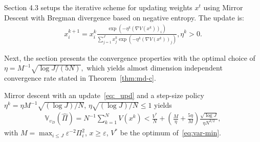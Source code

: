 Section 4.3 setups the iterative scheme for updating weights $x^t$ using Mirror Descent with Bregman divergence based on negative entropy. The update is:
\begin{align}
\label{eq:_upd}x^{k+1}_i = x^k_i \frac{\exp(-\eta^k(\nabla V(x^k))_i)}{\sum_{j=1}^J x^k_j \exp(-\eta^k(\nabla V(x^k))_j)}, \eta^k > 0.
\end{align}

Next, the section presents the convergence properties
with the optimal choice of 
$\eta = M^{-1}\sqrt{\log J/(5N)},$ which yields almost dimension independent convergence rate stated in  Theorem~\ref{thm:md-c}. 
\begin{theorem}\label{thm:md-c} Mirror descent with an update~\eqref{eq:_upd} and a step-size policy $\eta^k \!=\! \eta M^{-1}\!\sqrt{(\log J)/N}$,  $\eta \sqrt{(\log J)/N}\!\le\! 1$ yields
\begin{align*}
    \mathbb{V}_{\upsilon_D} (\hat \Pi) = N^{-1}\sum_{k=1}^N V(x^k) < \frac{V^*}{N} +  \left(\frac{M}{\eta}+ \frac{5\eta}{M}\right)\frac{\sqrt{\log J}}{\eta N^{3/2}}, 
\end{align*}
with $M \!= \!\max_{i\le J}\varepsilon^{-2}\Pi_i^2$,  $x\!\ge\! \varepsilon$, $V^*$ be the optimum of~\eqref{eq:var-min}.
\end{theorem}

